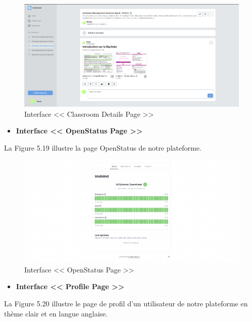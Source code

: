 \begin{figure}[H]
    \centering
    \includegraphics[width=1.1\textwidth,height=0.5\textwidth]{images/chp5/fig18.png}
    \caption{Interface << Classroom Details Page >>}
    \label{Interface << Classroom Details Page >>}    
\end{figure}
\begin{itemize}
    \item \textbf{Interface << OpenStatus Page >>}
\end{itemize}
La Figure 5.19 illustre la page OpenStatus de notre plateforme.
\begin{figure}[H]
    \centering
    \includegraphics[width=1.1\textwidth,height=0.5\textwidth]{images/chp5/fig19.png}
    \caption{Interface << OpenStatus Page >>}
    \label{Interface << OpenStatus Page >>}    
\end{figure}
\begin{itemize}
    \item \textbf{Interface << Profile Page >>}
\end{itemize}
La Figure 5.20 illustre le page de profil d'un utilisateur de notre plateforme en thème clair et en langue anglaise.
